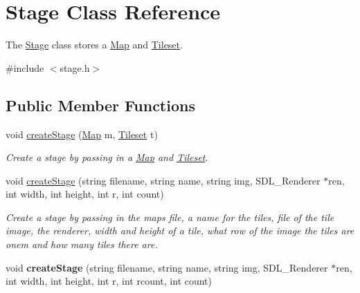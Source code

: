 \hypertarget{classStage}{}\section{Stage Class Reference}
\label{classStage}


The \hyperlink{classStage}{Stage} class stores a \hyperlink{classMap}{Map} and \hyperlink{classTileset}{Tileset}.  




{\ttfamily \#include $<$stage.\+h$>$}

\subsection*{Public Member Functions}
\begin{DoxyCompactItemize}
\item 
\mbox{\label{classStage_a716561c7b2b148b67e7cf4952bae937b}} 
void \hyperlink{classStage_a716561c7b2b148b67e7cf4952bae937b}{create\+Stage} (\hyperlink{classMap}{Map} m, \hyperlink{classTileset}{Tileset} t)
\begin{DoxyCompactList}\small\item\em Create a stage by passing in a \hyperlink{classMap}{Map} and \hyperlink{classTileset}{Tileset}. \end{DoxyCompactList}\item 
\mbox{\label{classStage_ad552bc548e34ff668944a6fc20b2aa0d}} 
void \hyperlink{classStage_ad552bc548e34ff668944a6fc20b2aa0d}{create\+Stage} (string filename, string name, string img, S\+D\+L\+\_\+\+Renderer $\ast$ren, int width, int height, int r, int count)
\begin{DoxyCompactList}\small\item\em Create a stage by passing in the maps file, a name for the tiles, file of the tile image, the renderer, width and height of a tile, what row of the image the tiles are onem and how many tiles there are. \end{DoxyCompactList}\item 
\mbox{\label{classStage_a871e4913cf2566a1a3a21c9d2e962648}} 
void {\bfseries create\+Stage} (string filename, string name, string img, S\+D\+L\+\_\+\+Renderer $\ast$ren, int width, int height, int r, int rcount, int count)
\item 
\mbox{\label{classStage_a8ab003560188a4004ee497fd23692833}} 

\end{DoxyCompactItemize}
